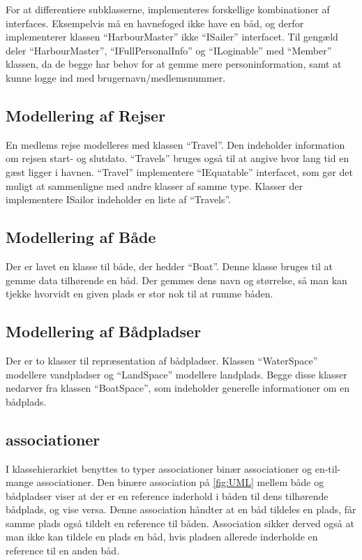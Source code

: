 For at differentiere subklasserne, implementeres forskellige kombinationer af interfaces. Eksempelvis må en havnefoged ikke have en båd, og derfor implementerer klassen \enquote{HarbourMaster} ikke \enquote{ISailer} interfacet. Til gengæld deler \enquote{HarbourMaster}, \enquote{IFullPersonalInfo} og \enquote{ILoginable} med \enquote{Member} klassen, da de begge har behov for at gemme mere personinformation, samt at kunne logge ind med brugernavn/medlemsnummer.
 
\subsection{Modellering af Rejser}
\label{sub:rejser}

En medlems rejse modelleres med klassen \enquote{Travel}. Den indeholder information om rejsen start- og slutdato. \enquote{Travels} bruges også til at angive hvor lang tid en gæst ligger i havnen. \enquote{Travel} implementere \enquote{IEquatable} interfacet, som gør det muligt at sammenligne med andre klasser af samme type. Klasser der implementere ISailor indeholder en liste af \enquote{Travels}.
 
\subsection{Modellering af Både}
\label{sub:bade}

Der er lavet en klasse til både, der hedder \enquote{Boat}. Denne klasse bruges til at gemme data tilhørende en båd. Der gemmes dens navn og størrelse, så man kan tjekke hvorvidt en given plads er stor nok til at rumme båden.

\subsection{Modellering af Bådpladser}
\label{sub:pladser}

Der er to klasser til repræsentation af bådpladser. Klassen \enquote{WaterSpace} modellere vandpladser og \enquote{LandSpace} modellere landplads. Begge disse klasser nedarver fra klassen \enquote{BoatSpace}, som indeholder generelle informationer om en bådplads. 

\subsection{associationer}
\label{sub:associationer}

I klassehierarkiet benyttes to typer associationer binær associationer og en-til-mange associationer. Den binære association på \cref{fig:UML} mellem både og bådpladser viser at der er en reference inderhold i båden til dens tilhørende bådplads, og vise versa. Denne association håndter at en båd tildeles en plads, får samme plads også tildelt en reference til båden. Association sikker derved også at man ikke kan tildele en plads en båd, hvis pladsen allerede inderholde en reference til en anden båd. 

